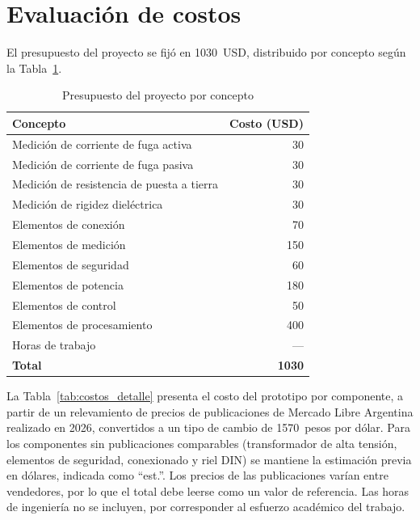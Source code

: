 \section{Evaluación de costos}
\label{sec:costos}

El presupuesto del proyecto se fijó en \SI{1030}{USD}, distribuido por concepto
según la Tabla~\ref{tab:presupuesto}.

\begin{table}[htbp]
\centering
\caption{Presupuesto del proyecto por concepto}
\label{tab:presupuesto}
\renewcommand{\arraystretch}{1.2}
\begin{tabular}{@{} l r @{}}
\toprule
\textbf{Concepto} & \textbf{Costo (USD)} \\
\midrule
Medición de corriente de fuga activa       & 30 \\
Medición de corriente de fuga pasiva       & 30 \\
Medición de resistencia de puesta a tierra & 30 \\
Medición de rigidez dieléctrica            & 30 \\
Elementos de conexión                      & 70 \\
Elementos de medición                      & 150 \\
Elementos de seguridad                     & 60 \\
Elementos de potencia                      & 180 \\
Elementos de control                       & 50 \\
Elementos de procesamiento                 & 400 \\
Horas de trabajo                           & --- \\
\midrule
\textbf{Total}                             & \textbf{1030} \\
\bottomrule
\end{tabular}
\end{table}

La Tabla~\ref{tab:costos_detalle} presenta el costo del prototipo por componente,
a partir de un relevamiento de precios de publicaciones de Mercado Libre Argentina
realizado en 2026, convertidos a un tipo de cambio de
\num{1570}~pesos por dólar. Para los componentes sin publicaciones comparables
(transformador de alta tensión, elementos de seguridad, conexionado y riel DIN) se
mantiene la estimación previa en dólares, indicada como ``est.''. Los precios de
las publicaciones varían entre vendedores, por lo que el total debe leerse como
un valor de referencia. Las horas de ingeniería no se incluyen, por corresponder
al esfuerzo académico del trabajo.

